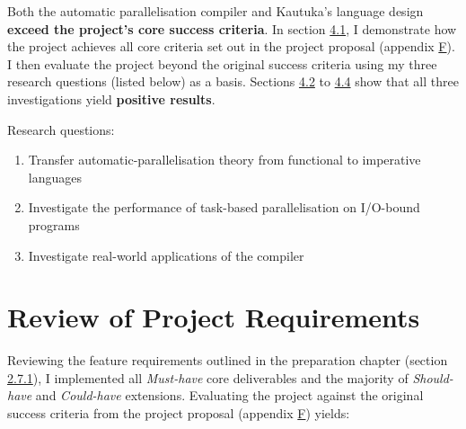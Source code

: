 




\label{sec:4}

Both the automatic parallelisation compiler and Kautuka's language design \textbf{exceed the project's core success criteria}. In section \hyperref[sec:4.1]{4.1}, I demonstrate how the project achieves all core criteria set out in the project proposal (appendix \hyperref[sec:F]{F}). I then evaluate the project beyond the original success criteria using my three research questions (listed below) as a basis. Sections \hyperref[sec:4.2]{4.2} to \hyperref[sec:4.4]{4.4} show that all three investigations yield \textbf{positive results}.

\vspace{1mm}

Research questions:
\vspace{-5mm}

\begin{enumerate}
  \setlength{\itemsep}{2pt}
        \setlength{\parskip}{0pt}
        \setlength{\parsep}{0pt}
  \item Transfer automatic-parallelisation theory from functional to imperative languages
  \item Investigate the performance of task-based parallelisation on I/O-bound programs
  \item Investigate real-world applications of the compiler
\end{enumerate}

\vspace{-3mm}

\section{Review of Project Requirements}

\label{sec:4.1}

Reviewing the feature requirements outlined in the preparation chapter (section \hyperref[sec:2.7.1]{2.7.1}), I implemented all \textit{Must-have} core deliverables and the majority of \textit{Should-have} and \textit{Could-have} extensions. Evaluating the project against the original success criteria from the project proposal (appendix \hyperref[sec:F]{F}) yields:

